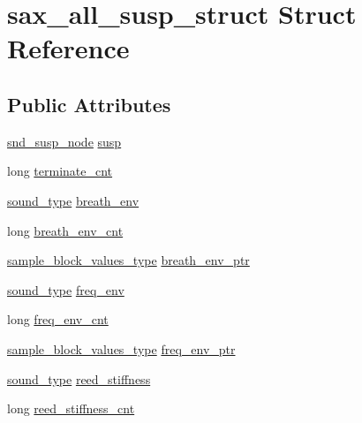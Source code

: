 \hypertarget{structsax__all__susp__struct}{}\section{sax\+\_\+all\+\_\+susp\+\_\+struct Struct Reference}
\label{structsax__all__susp__struct}
\subsection*{Public Attributes}
\begin{DoxyCompactItemize}
\item 
\hyperlink{sound_8h_a6b268203688a934bd798ceb55f85d4c0}{snd\+\_\+susp\+\_\+node} \hyperlink{structsax__all__susp__struct_a1cbaa92cd26cbf2ed2025790d6d23a0a}{susp}
\item 
long \hyperlink{structsax__all__susp__struct_a3a198be8f5b934a21475d8ef9d21a2c6}{terminate\+\_\+cnt}
\item 
\hyperlink{sound_8h_a792cec4ed9d6d636d342d9365ba265ea}{sound\+\_\+type} \hyperlink{structsax__all__susp__struct_a8e1b745b0a3d1315c34a46e63ae605ce}{breath\+\_\+env}
\item 
long \hyperlink{structsax__all__susp__struct_a3a50b9b9c108d3d64372ea587b16d9ff}{breath\+\_\+env\+\_\+cnt}
\item 
\hyperlink{sound_8h_a83d17f7b465d1591f27cd28fc5eb8a03}{sample\+\_\+block\+\_\+values\+\_\+type} \hyperlink{structsax__all__susp__struct_a57a88e4d744a3362eaaf7a40ff176a48}{breath\+\_\+env\+\_\+ptr}
\item 
\hyperlink{sound_8h_a792cec4ed9d6d636d342d9365ba265ea}{sound\+\_\+type} \hyperlink{structsax__all__susp__struct_a6aa191440c4e2d04324a08297a510569}{freq\+\_\+env}
\item 
long \hyperlink{structsax__all__susp__struct_a88121c49c7a0ff572ef5cd781130fcb1}{freq\+\_\+env\+\_\+cnt}
\item 
\hyperlink{sound_8h_a83d17f7b465d1591f27cd28fc5eb8a03}{sample\+\_\+block\+\_\+values\+\_\+type} \hyperlink{structsax__all__susp__struct_a11190a67226e970e4b4c0d0fcd4fe744}{freq\+\_\+env\+\_\+ptr}
\item 
\hyperlink{sound_8h_a792cec4ed9d6d636d342d9365ba265ea}{sound\+\_\+type} \hyperlink{structsax__all__susp__struct_ac3eabb85148bc2c9312208efedee19a1}{reed\+\_\+stiffness}
\item 
long \hyperlink{structsax__all__susp__struct_ab367b4a79907c821fa78ea8dcb7ba2d9}{reed\+\_\+stiffness\+\_\+cnt}
\item 

\end{DoxyCompactItemize}
